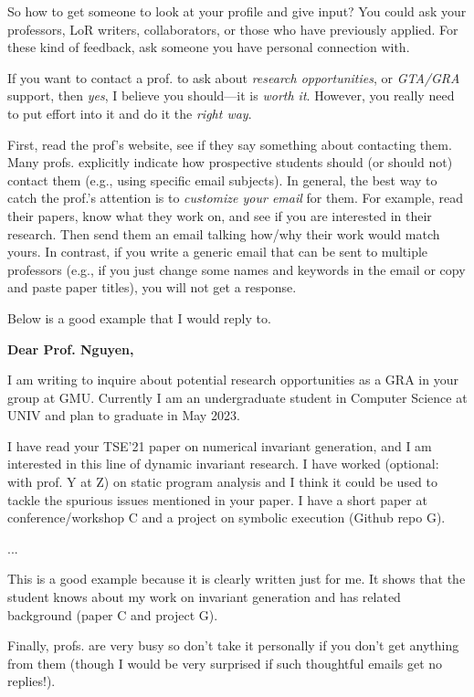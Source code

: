 \documentclass[oneside,11pt]{book}
\newenvironment{commentbox}[1][]{
  \small
  \begin{mybox}
    {\small \textbf{#1}}
  }{
  \end{mybox}
}
\begin{document}
So how to get someone to look at your profile and give input? You could ask your professors, LoR writers, collaborators, or those who have previously applied. For these kind of feedback, ask someone you have personal connection with.  

If you want to contact a prof. to ask about \emph{research opportunities}, or \emph{GTA/GRA} support, then \emph{yes}, I believe you should---it is \emph{worth it}. However, you really need to put effort into it and do it the \emph{right way}.

First, read the prof's website, see if they say something about contacting them. Many profs. explicitly indicate how prospective students should (or should not) contact them (e.g., using specific email subjects).
In general, the best way to catch the prof.'s attention is to \emph{customize your email} for them.  For example, read their papers, know what they work on, and see if you are interested in their research. Then send them an email talking how/why their work would match yours.
In contrast, if you write a generic email that can be sent to multiple professors (e.g., if you just change some names and keywords in the email or copy and paste paper titles), you will not get a response.

Below is a good example that I would reply to.   

\begin{commentbox}[Dear Prof. Nguyen,]

  I am writing to inquire about potential research opportunities as a GRA in your group at GMU. Currently I am an undergraduate student in Computer Science at UNIV and plan to graduate in May 2023.


  I have read your TSE'21 paper on numerical invariant generation, and I am interested in this line of dynamic invariant research. I have worked (optional: with prof. Y at Z) on static program analysis and I think it could be used to tackle the spurious issues mentioned in your paper. I have a short paper at conference/workshop C and a project on symbolic execution (Github repo G).

  ...

  This is a good example because it is clearly written just for me.  It shows that the student knows about my work on invariant generation and has related  background (paper C and project G).
\end{commentbox}

Finally, profs. are very busy so don't take it personally if you don't get anything from them (though I would be very surprised if such thoughtful emails get no replies!). 
\end{document}
